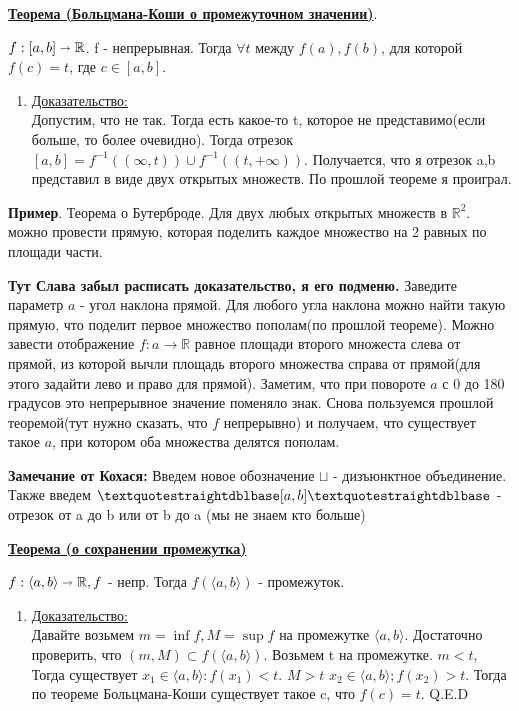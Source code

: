 \documentclass{article}
\newcommand{\thmm}[1]{\underline{\textbf{#1}}}
\newcommand{\prooff}[1]{{\underline{Доказательство:}} \\ }
\begin{document}
\thmm{Теорема (Больцмана-Коши о промежуточном значении)}.

$f: [a,b] \shortrightarrow \mathbb{R}$. f - непрерывная. Тогда $\forall t$ между $f(a),f(b)$, для которой $f(c) = t$, где $c \in [a,b]$.

\begin{enumerate}
    \item[] \prooff{}
    Допустим, что не так. Тогда есть какое-то t, которое не представимо(если больше, то более очевидно). Тогда отрезок $[a,b] = f^{-1}((\infty,t)) \cup f^{-1}((t,+\infty))$. Получается, что я отрезок a,b представил в виде двух открытых множеств. По прошлой теореме я проиграл.
\end{enumerate}

\textbf{Пример}. Теорема о Бутерброде. Для двух любых открытых множеств в $\mathbb{R}^2$. можно провести прямую, которая поделить каждое множество на 2 равных по площади части.

\textbf{Тут Слава забыл расписать доказательство, я его подменю.} Заведите параметр $a$ - угол наклона прямой. Для любого угла наклона можно найти такую прямую, что поделит первое множество пополам(по прошлой теореме). Можно завести отображение $f : a \rightarrow \mathbb{R}$ равное площади второго множеста слева от прямой, из которой вычли площадь второго множества справа от прямой(для этого задайти лево и право для прямой). Заметим, что при повороте $a$ с 0 до 180 градусов это непрерывное значение поменяло знак. Снова пользуемся прошлой теоремой(тут нужно сказать, что $f$ непрерывно) и получаем, что существует такое $a$, при котором оба множества делятся пополам.

\textbf{Замечание от Кохася:} Введем новое обозначение $\sqcup$ - дизъюнктное объединение. Также введем $\textquotestraightdblbase[a,b]\textquotestraightdblbase$ - отрезок от a до b или от b до a (мы не знаем кто больше)

\thmm{Теорема (о сохранении промежутка)}

$f: \langle a,b \rangle \shortrightarrow \mathbb{R}, f $ - непр. Тогда $f(\langle a,b \rangle)$ - промежуток.
\begin{enumerate}
    \item[] \prooff{}
    Давайте возьмем  $m = \inf f, M = \sup f$ на промежутке $\langle a,b \rangle$. Достаточно проверить, что $(m,M) \subset f( \langle a,b \rangle )$.  Возьмем t на промежутке. $m<t$,  Тогда существует $x_1 \in \langle a,b \rangle : f(x_1)<t$. $M>t$  $x_2 \in  \langle a,b \rangle; f(x_2)>t$. Тогда по теореме Больцмана-Коши существует такое c, что $f(c) =t$. Q.E.D 
\end{enumerate}
\end{document}
